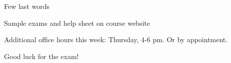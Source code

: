 \documentclass{./../../Latex/teaching_slides}
\begin{document}
\begin{frame}{Few last words}
\begin{witemize}
\item Sample exams and help sheet on course website
\item Additional office hours this week: Thursday, 4-6 pm. Or by appointment.
  \item Good luck for the exam!
\end{witemize}
\end{frame}
\end{document}

